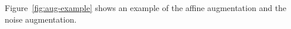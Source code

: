 \documentclass[journal]{IEEEtran}
\begin{document}
Figure~\ref{fig:aug-example} shows an example of the affine augmentation and the noise augmentation.
\begin{figure}[h]
	\centering
	\begin{minipage}{0.2\linewidth}
	\end{minipage}
	\begin{minipage}{0.2\linewidth}
\end{minipage}
\end{figure}
\end{document}
